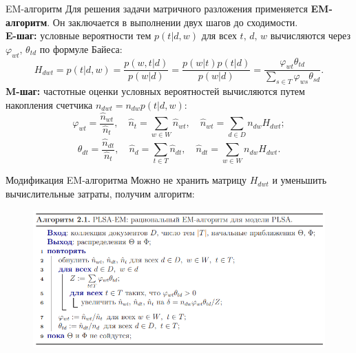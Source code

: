 \documentclass{beamer}
\begin{document}
\begin{frame}{EM-алгоритм}
Для решения задачи матричного разложения применяется \textbf{EM-алгоритм}. Он заключается в выполнении двух шагов до сходимости.\\
\vspace{2\ex}
\textbf{E-шаг:} условные вероятности тем $p(t|d,w)$ для всех $t,\,d,\,w$ вычисляются через $\varphi_{wt},\, \theta_{td}$ по формуле Байеса:
\begin{equation*}
    H_{dwt} = p(t| d, w) = \frac{p(w,t |d)}{p(w | d)} = \frac{p(w |t)p(t| d)}{p(w | d)} = \frac{\varphi_{wt}\theta_{td}}{\sum\limits_{s\in T}\varphi_{ws}\theta_{sd}}. 
\end{equation*}
\vspace{2\ex}
\textbf{M-шаг:} частотные оценки условных вероятностей вычисляются путем накопления счетчика $n_{dwt} = n_{dw}p(t|d,w)$:
\begin{equation*}
    \varphi_{wt} = \frac{\hat{n}_{wt}}{\hat{n}_{t}},\quad \hat{n}_t =\sum\limits_{w \in W}\hat{n}_{wt},\quad \hat{n}_{wt} = \sum\limits_{d \in D}n_{dw}H_{dwt};
\end{equation*}
\begin{equation*}
     \theta_{dt} = \frac{\hat{n}_{dt}}{\hat{n}_{t}},\quad \hat{n}_d =\sum\limits_{t \in T}\hat{n}_{dt},\quad \hat{n}_{dt} = \sum\limits_{w \in W}n_{dw}H_{dwt}.
\end{equation*}
\end{frame}

\begin{frame}{Модификация EM-алгоритма}
Можно не хранить матрицу $H_{dwt}$ и уменьшить вычислительные затраты, получим алгоритм:\\
\begin{figure}
   \begin{center}
   \includegraphics[scale = 0.55]{Em-алг.png}
   \end{center}
\end{figure}
\end{frame}
\end{document}

